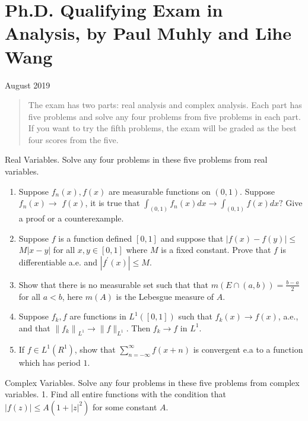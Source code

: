 \documentclass[10pt]{article}
\begin{document}
\section*{Ph.D. Qualifying Exam in Analysis, by Paul Muhly and Lihe Wang }
August 2019

\begin{abstract}
The exam has two parts: real analysis and complex analysis. Each part has five problems and solve any four problems from five problems in each part. 
 If you want to try the fifth problems, the exam will be graded as the best four scores from the five.
\end{abstract}

Real Variables. Solve any four problems in these five problems from real variables.

\begin{enumerate}
  \item Suppose $f_{n}(x), f(x)$ are measurable functions on $(0,1)$. Suppose $f_{n}(x) \rightarrow$ $f(x)$, it is true that $\int_{(0,1)} f_{n}(x) d x \rightarrow \int_{(0,1)} f(x) d x ?$ Give a proof or a counterexample.

  \item Suppose $f$ is a function defined $[0,1]$ and suppose that $|f(x)-f(y)| \leq$ $M|x-y|$ for all $x, y \in[0,1]$ where $M$ is a fixed constant. Prove that $f$ is differentiable a.e. and $\left|f^{\prime}(x)\right| \leq M$.

  \item Show that there is no measurable set such that that $m(E \cap(a, b))=\frac{b-a}{2}$ for all $a<b$, here $m(A)$ is the Lebesgue measure of $A$.

  \item Suppose $f_{k}, f$ are functions in $L^{1}([0,1])$ such that $f_{k}(x) \rightarrow f(x)$, a.e., and that $\left\|f_{k}\right\|_{L^{1}} \rightarrow\|f\|_{L^{1}}$. Then $f_{k} \rightarrow f$ in $L^{1}$.

  \item If $f \in L^{1}\left(R^{1}\right)$, show that $\sum_{n=-\infty}^{\infty} f(x+n)$ is convergent e.a to a function which has period $1 .$

\end{enumerate}
Complex Variables. Solve any four problems in these five problems from complex variables. 1. Find all entire functions with the condition that $|f(z)| \leq A\left(1+|z|^{2}\right)$ for some constant $A$.
\end{document}
